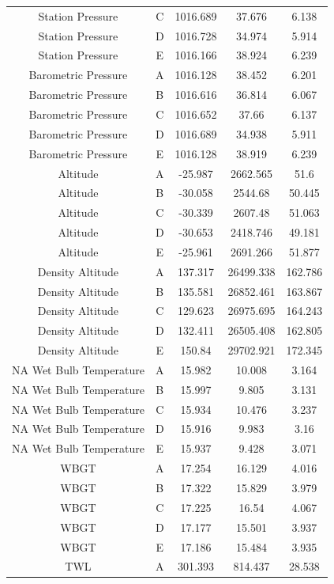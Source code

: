 \documentclass[a4paper]{article}
\numberwithin{figure}{section}
\numberwithin{table}{section}
\begin{document}
\begin{longtable}{ccccc}
Station Pressure & C & 1016.689 & 37.676 & 6.138 \\
Station Pressure & D & 1016.728 & 34.974 & 5.914 \\
Station Pressure & E & 1016.166 & 38.924 & 6.239 \\
Barometric Pressure & A & 1016.128 & 38.452 & 6.201 \\
Barometric Pressure & B & 1016.616 & 36.814 & 6.067 \\
Barometric Pressure & C & 1016.652 & 37.66 & 6.137 \\
Barometric Pressure & D & 1016.689 & 34.938 & 5.911 \\
Barometric Pressure & E & 1016.128 & 38.919 & 6.239 \\
Altitude & A & -25.987 & 2662.565 & 51.6 \\
Altitude & B & -30.058 & 2544.68 & 50.445 \\
Altitude & C & -30.339 & 2607.48 & 51.063 \\
Altitude & D & -30.653 & 2418.746 & 49.181 \\
Altitude & E & -25.961 & 2691.266 & 51.877 \\
Density Altitude & A & 137.317 & 26499.338 & 162.786 \\
Density Altitude & B & 135.581 & 26852.461 & 163.867 \\
Density Altitude & C & 129.623 & 26975.695 & 164.243 \\
Density Altitude & D & 132.411 & 26505.408 & 162.805 \\
Density Altitude & E & 150.84 & 29702.921 & 172.345 \\
NA Wet Bulb Temperature & A & 15.982 & 10.008 & 3.164 \\
NA Wet Bulb Temperature & B & 15.997 & 9.805 & 3.131 \\
NA Wet Bulb Temperature & C & 15.934 & 10.476 & 3.237 \\
NA Wet Bulb Temperature & D & 15.916 & 9.983 & 3.16 \\
NA Wet Bulb Temperature & E & 15.937 & 9.428 & 3.071 \\
WBGT & A & 17.254 & 16.129 & 4.016 \\
WBGT & B & 17.322 & 15.829 & 3.979 \\
WBGT & C & 17.225 & 16.54 & 4.067 \\
WBGT & D & 17.177 & 15.501 & 3.937 \\
WBGT & E & 17.186 & 15.484 & 3.935 \\
TWL  & A & 301.393 & 814.437 & 28.538 \\

\end{longtable}
\end{document}
